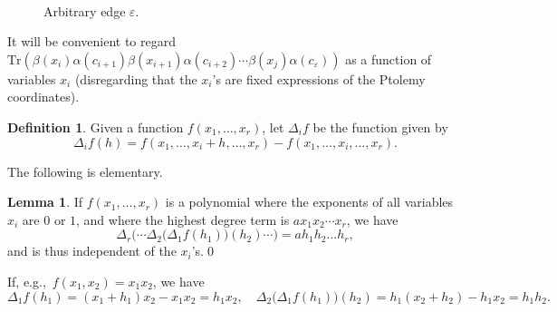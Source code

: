 \documentclass[12pt]{amsart}
\theoremstyle{definition}
\newtheorem{lemma}[theorem]{Lemma}
\newtheorem{definition}[theorem]{Definition}
\numberwithin{equation}{section}
\def\Tr{\mathrm{Tr}}
\begin{document}
\begin{figure}[htb]
\begin{center}
\hspace{-10mm}
\begin{minipage}[c]{0.4\textwidth}
\scalebox{0.8}{}
\end{minipage}
\begin{minipage}[c]{0.6\textwidth}
\scalebox{0.8}{}
\end{minipage}
\hfill
\\
\begin{minipage}[t]{0.35\textwidth}
\captionsetup{width=1\textwidth}
\caption{3-cycle case.}\label{fig:TreeWithThreeCycleCase}
\end{minipage}
\hspace{2mm}
\begin{minipage}[t]{0.5\textwidth}
\captionsetup{width=\textwidth}
\caption[Bla]{Arbitrary edge $\varepsilon$.}\label{fig:ArbitraryEdgeCase}
\end{minipage}
\end{center}
\end{figure}

It will be convenient to regard $\Tr(\beta(x_i)\alpha(c_{i+1})\beta(x_{i+1})\alpha(c_{i+2})\cdots \beta(x_j)\alpha(c_\varepsilon))$ as a function of variables $x_i$ (disregarding that the $x_i$'s are fixed expressions of the Ptolemy coordinates).
\begin{definition}
Given a function $f(x_1,\dots,x_r)$, let $\Delta_{i}f$ be the function given by
\begin{equation}
\Delta_{i}f(h)=f(x_1,\dots,x_i+h,\dots,x_r)-f(x_1,\dots,x_i,\dots,x_r).
\end{equation}
\end{definition}
The following is elementary.%
\begin{lemma}\label{lemma:Deltas} If $f(x_1,\dots,x_r)$ is a polynomial where the exponents of all variables $x_i$ are $0$ or $1$, and where the highest degree term is $ax_1x_2\cdots x_r$, we have
\begin{equation}\label{eq:Deltas}
\Delta_r\big(\cdots\Delta_2\big(\Delta_1f(h_1)\big)(h_2)\cdots\big)=ah_1h_2\dots h_r,
\end{equation}
and is thus independent of the $x_i$'s.\qed
\end{lemma}
If, e.g.,~$f(x_1,x_2)=x_1x_2$, we have
\begin{equation}\label{eq:DeltaExample}
\Delta_1f(h_1)=(x_1+h_1)x_2-x_1x_2=h_1x_2,\quad \Delta_2\big(\Delta_1f(h_1)\big)(h_2)=h_1(x_2+h_2)-h_1x_2=h_1h_2.
\end{equation}
\end{document}
